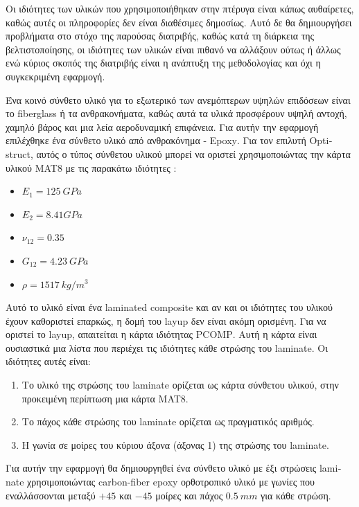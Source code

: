 Οι ιδιότητες των υλικών που χρησιμοποιήθηκαν στην πτέρυγα είναι κάπως αυθαίρετες, καθώς αυτές οι πληροφορίες δεν είναι διαθέσιμες δημοσίως. Αυτό δε θα δημιουργήσει προβλήματα στο στόχο της παρούσας διατριβής, καθώς κατά τη διάρκεια της βελτιστοποίησης, οι ιδιότητες των υλικών είναι πιθανό να αλλάξουν ούτως ή άλλως ενώ κύριος σκοπός της διατριβής είναι η ανάπτυξη της μεθοδολογίας και όχι η συγκεκριμένη εφαρμογή.

Ένα κοινό σύνθετο υλικό για το εξωτερικό των  ανεμόπτερων υψηλών επιδόσεων είναι το \textlatin{fiberglass} ή τα ανθρακονήματα, καθώς αυτά τα υλικά προσφέρουν υψηλή αντοχή, χαμηλό βάρος και μια λεία αεροδυναμική επιφάνεια. Για αυτήν την εφαρμογή επιλέχθηκε ένα σύνθετο υλικό από ανθρακόνημα - \textlatin{Epoxy}. Για τον επιλυτή \textlatin{Optistruct}, αυτός ο τύπος σύνθετου υλικού μπορεί να οριστεί χρησιμοποιώντας την κάρτα υλικού \textlatin{MAT8} με τις παρακάτω ιδιότητες \cite{matweb}:


\begin{itemize}
\item
  \(E_{1} = 125\ GPa\)
\item
  \(E_{2} = 8.41GPa\)
\item
  \(\nu_{12} = 0.35\)
\item
  \(G_{12} = 4.23\ GPa\)
\item
  \(\rho = 1517\ kg\text{/}m^{3}\)
\end{itemize}

Αυτό το υλικό είναι ένα \textlatin{laminated composite} και αν και οι ιδιότητες του υλικού έχουν καθοριστεί επαρκώς, η δομή του \textlatin{layup} δεν είναι ακόμη ορισμένη. Για να οριστεί το \textlatin{layup}, απαιτείται η κάρτα ιδιότητας \textlatin{PCOMP}. Αυτή η κάρτα είναι ουσιαστικά μια λίστα που περιέχει τις ιδιότητες κάθε στρώσης του \textlatin{laminate}. Οι ιδιότητες αυτές είναι:

\begin{enumerate}
  \def\labelenumi{\arabic{enumi}.}
  \item
    Το υλικό της στρώσης του \textlatin{laminate} ορίζεται ως κάρτα σύνθετου υλικού, στην προκειμένη περίπτωση μια κάρτα \textlatin{MAT8}.
  \item
    Το πάχος κάθε στρώσης του \textlatin{laminate} ορίζεται ως πραγματικός αριθμός.
  \item
    Η γωνία σε μοίρες του κύριου άξονα (άξονας 1) της στρώσης του \textlatin{laminate}.
  \end{enumerate}
  
  Για αυτήν την εφαρμογή θα δημιουργηθεί ένα σύνθετο υλικό με έξι στρώσεις \textlatin{laminate} χρησιμοποιώντας \textlatin{carbon-fiber epoxy} ορθοτροπικό υλικό με γωνίες που εναλλάσσονται μεταξύ $+45$ και $-45$ μοίρες και πάχος \(0.5\ mm\) για κάθε στρώση.
  
